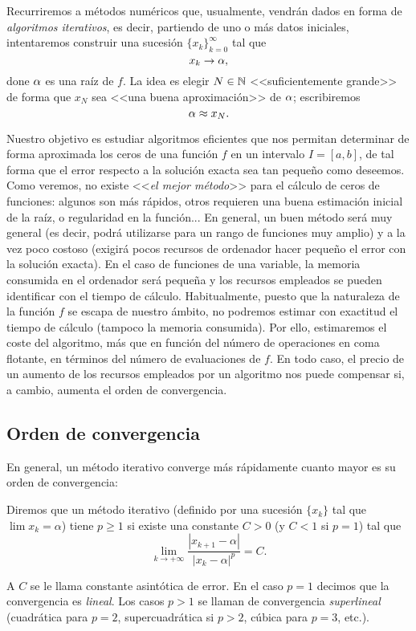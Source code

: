 Recurriremos a métodos numéricos que, usualmente, vendrán dados en
forma de \textit{algoritmos iterativos}, es decir, partiendo de uno o
más datos iniciales, intentaremos construir una sucesión
$\{x_k\}_{k=0}^{\infty}$ tal que
$$
x_k \to \alpha,
$$
done $\alpha$ es una raíz de $f$. La idea es elegir $N\in\operatorname{{\mathbb N}}$
<<suficientemente grande>> de forma que $x_N$ sea <<una buena
aproximación>> de $\alpha$; escribiremos
$$
\alpha\approx x_N.
$$

Nuestro objetivo es estudiar algoritmos eficientes que nos permitan
determinar de forma aproximada los ceros de una función $f$ en un
intervalo $I=[a,b]$, de tal forma que el error respecto a la solución
exacta sea tan pequeño como deseemos. Como veremos, no existe
<<\textit{el mejor método}>> para el cálculo de ceros de funciones:
algunos son más rápidos, otros requieren una buena estimación inicial
de la raíz, o regularidad en la función... En general, un buen método
será muy general (es decir, podrá utilizarse para un rango de
funciones muy amplio) y a la vez poco costoso (exigirá pocos recursos
de ordenador hacer pequeño el error con la solución exacta). En el
caso de funciones de una variable, la memoria consumida en el
ordenador será pequeña y los recursos empleados se pueden identificar
con el tiempo de cálculo. Habitualmente, puesto que la naturaleza de
la función $f$ se escapa de nuestro ámbito, no podremos estimar con
exactitud el tiempo de cálculo (tampoco la memoria consumida). Por
ello, estimaremos el coste del algoritmo, más que en función del
número de operaciones en coma flotante, en términos del número de
evaluaciones de $f$. En todo caso, el precio de un aumento de los
recursos empleados por un algoritmo nos puede compensar si, a cambio,
aumenta el orden de convergencia.

\subsection*{Orden de convergencia}

En general, un método iterativo converge más rápidamente cuanto mayor
es su orden de convergencia:

\begin{definition}
  \label{def:orden-convergencia}  
  Diremos que un método iterativo (definido por una sucesión $\{x_k\}$
  tal que $\lim x_k=\alpha$) tiene  $p\ge 1$ si existe una constante $C>0$ (y $C<1$ si
  $p=1$) tal que
  \begin{equation}
    \label{eq:orden-convergencia}
    \lim_{k\to+\infty} \frac{|x_{k+1}-\alpha|}{|x_k-\alpha|^p} = C.
  \end{equation}
\end{definition}
A $C$ se le llama constante asintótica de error. En el caso $p=1$ 
decimos que la convergencia es \textit{lineal}. Los casos $p>1$ se
llaman de convergencia \textit{superlineal} (cuadrática para $p=2$,
supercuadrática si $p>2$, cúbica para $p=3$, etc.).

